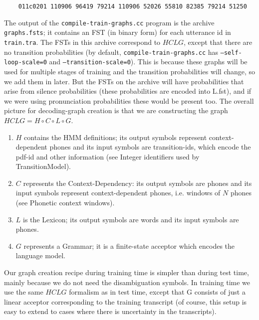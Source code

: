 \documentclass[10pt,a4paper]{article}
\begin{document}
\begin{itemize}
\begin{itemize}
    \begin{verbatim}
    011c0201 110906 96419 79214 110906 52026 55810 82385 79214 51250
    \end{verbatim}

    The output of the \texttt{compile-train-graphs.cc} program is the archive \texttt{graphs.fsts}; it contains an FST (in binary form) for each utterance id in \texttt{train.tra}. The FSTs in this archive correspond to $HCLG$, except that there are no transition probabilities (by default, \texttt{compile-train-graphs.cc} has \texttt{--self-loop-scale=0} and \texttt{--transition-scale=0}). This is because these graphs will be used for multiple stages of training and the transition probabilities will change, so we add them in later. But the FSTs on the archive will have probabilities that arise from silence probabilities (these probabilities are encoded into L.fst), and if we were using pronunciation probabilities these would be present too.
    The overall picture for decoding-graph creation is that we are constructing the graph $HCLG = H \circ C \circ L \circ G$.\\

    \begin{enumerate}
    \item $H$ contains the HMM definitions; its output symbols represent context-dependent phones and its input symbols are transition-ids, which encode the pdf-id and other information (see Integer identifiers used by TransitionModel).
    \item $C$ represents the Context-Dependency: its output symbols are phones and its input symbols represent context-dependent phones, i.e. windows of $N$ phones (see Phonetic context windows).
    \item $L$ is the Lexicon; its output symbols are words and its input symbols are phones.
    \item $G$ represents a Grammar; it is a finite-state acceptor which encodes the language model.\\
    \end{enumerate}
    
    Our graph creation recipe during training time is simpler than during test time, mainly because we do not need the disambiguation symbols. In training time we use the same $HCLG$ formalism as in test time, except that G consists of just a linear acceptor corresponding to the training transcript (of course, this setup is easy to extend to cases where there is uncertainty in the transcripts).


\end{itemize}
\end{itemize}
\end{document}
